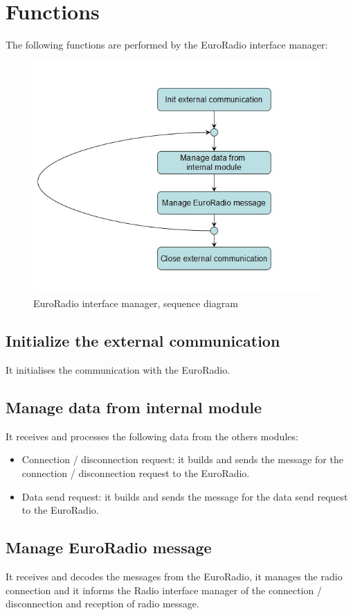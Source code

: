 \documentclass[nocc]{template/openetcs_report}
\begin{document}
\section{Functions}
The following functions are performed by the EuroRadio interface manager:
\begin{figure}[!h]
  \centering
  \includegraphics[width=\textwidth]{image/evc_euroradio_interf_manager}
  \caption{EuroRadio interface manager, sequence diagram}
  \label{fig:EuroRadio interface manager, sequence diagram}
\end{figure}
\subsection{Initialize the external communication}
It initialises the communication with the EuroRadio.
\subsection{Manage data from internal module}
It receives and processes the following data from the others modules:
\begin{itemize}
\item Connection / disconnection request: it builds and sends the message for the connection / disconnection request to the EuroRadio.
\item Data send request: it builds and sends the message for the data send request to the EuroRadio.
\end{itemize}
\subsection{Manage EuroRadio message}
It receives and decodes the messages from the EuroRadio, it manages the radio connection and it informs the Radio interface manager of the connection / disconnection and reception of radio message.
\end{document}
